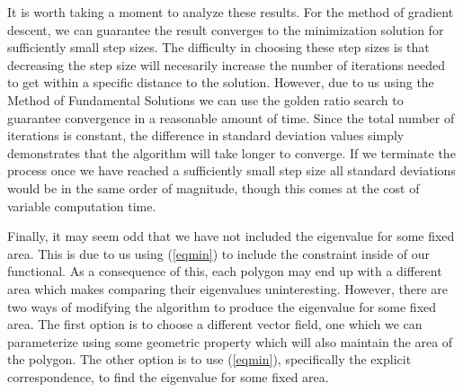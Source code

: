 It is worth taking a moment to analyze these results.
For the method of gradient descent, we can guarantee the result converges to the minimization solution for sufficiently small step sizes\cite{curry}.
The difficulty in choosing these step sizes is that decreasing the step size will necesarily increase the number of iterations needed to get within a specific distance to the solution.
However, due to us using the Method of Fundamental Solutions we can use the golden ratio search to guarantee convergence in a reasonable amount of time.
Since the total number of iterations is constant, the difference in standard deviation values simply demonstrates that the algorithm will take longer to converge. 
If we terminate the process once we have reached a sufficiently small step size all standard deviations would be in the same order of magnitude, though this comes at the cost of variable computation time. 

Finally, it may seem odd that we have not included the eigenvalue for some fixed area.
This is due to us using (\ref{eqmin}) to include the constraint inside of our functional.
As a consequence of this, each polygon may end up with a different area which makes comparing their eigenvalues uninteresting.
However, there are two ways of modifying the algorithm to produce the eigenvalue for some fixed area.
The first option is to choose a different vector field, one which we can parameterize using some geometric property which will also maintain the area of the polygon.
The other option is to use (\ref{eqmin}), specifically the explicit correspondence, to find the eigenvalue for some fixed area.



\break
